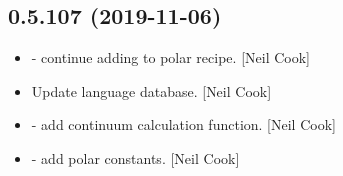\documentclass[a4paper,10pt,english]{report}
\begin{document}
\subsection{0.5.107 (2019-11-06)}
\label{\detokenize{misc/changelog:id35}}\begin{itemize}
\item {} 
 - continue adding to polar recipe.
{[}Neil Cook{]}

\item {} 
Update language database. {[}Neil Cook{]}

\item {} 
 - add continuum calculation function. {[}Neil Cook{]}

\item {} 
 - add polar constants. {[}Neil
Cook{]}

\end{itemize}
\end{document}
